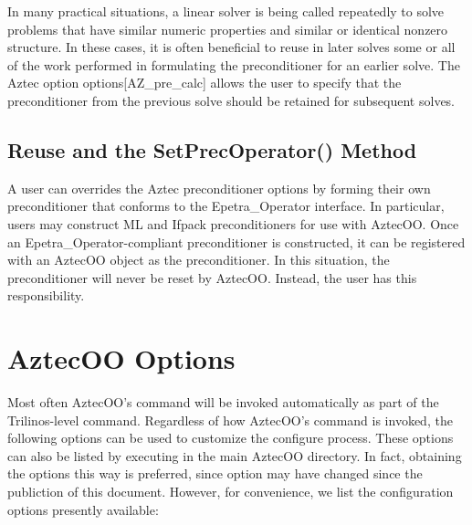 \documentclass[12pt,relax]{AztecOOUserGuide}
\newcommand{\operator}{Epetra\_Operator}
\begin{document}
In many practical situations, a linear solver is being called
repeatedly to solve problems that have similar numeric properties and
similar or identical nonzero structure.  In these cases, it is often
beneficial to reuse in later solves some or all of the work performed
in formulating the preconditioner for an earlier solve.  The Aztec
option options[{\sf AZ\_pre\_calc}] allows the user to specify that the
preconditioner from the previous solve should be retained for
subsequent solves.  

\subsection{Reuse and the SetPrecOperator() Method}

A user can overrides the Aztec preconditioner options by
forming their own preconditioner that conforms to the \operator{}
interface.  In particular, users may construct ML and Ifpack
preconditioners for use with AztecOO.  Once an \operator{}-compliant
preconditioner is constructed, it can be registered with an AztecOO
object as the preconditioner.  In this situation, the preconditioner
will never be reset by AztecOO.  Instead, the user has this responsibility.

\clearpage



\appendix
\section{AztecOO  Options}

Most often AztecOO's  command will be invoked automatically as
part of the Trilinos-level  command.  Regardless of how 
AztecOO's  command is invoked, the following options can be 
used to customize the configure process.  These options can also be listed  by executing
in the main AztecOO directory.  In fact, obtaining the options this way is preferred, since
option may have changed since the publiction of this document.  However, for convenience, we
list the configuration options presently available:
\end{document}
